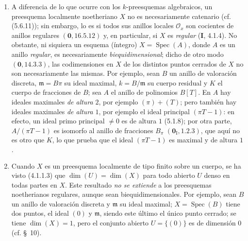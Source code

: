 \begin{remarks}[5.2.5]
\label{IV.2.5.2.5-fr}
\begin{enumerate}
\item[(i)] A diferencia de lo que ocurre con los $k$-preesquemas algebraicos,
un preesquema localmente noetheriano $X$ no es necesariamente catenario
(cf. (5.6.11)); sin embargo, lo es si todos sus anillos locales $\mathcal O_x$
son cocientes de anillos regulares $(\mathbf{0},16.5.12)$ y, en particular, si $X$ es
\emph{regular} (\textbf I, 4.1.4). No obstante, ni siquiera un esquema (íntegro)
$X=\operatorname{Spec}(A)$, donde $A$ es un anillo \emph{regular}, es
necesariamente \emph{biequidimensional}; dicho de otro modo $(\mathbf{0},14.3.3)$,
las codimensiones en $X$ de los distintos puntos cerrados de $X$ no son
necesariamente las mismas. Por ejemplo, sean $B$ un anillo de valoración
discreta, $\mathfrak m=B\pi$ su ideal maximal, $k=B/\mathfrak m$ su cuerpo
residual y $K$ el cuerpo de fracciones de $B$; sea $A$ el anillo de polinomios
$B[T]$. En $A$ hay ideales maximales \emph{de altura} $2$, por ejemplo
$(\pi)+(T)$; pero también hay ideales maximales \emph{de altura} $1$, por
ejemplo el ideal principal $(\pi T-1)$: en efecto, un ideal primo principal
$\ne0$ es de altura $1$ (5.1.8); por otra parte,
$A/(\pi T-1)$ es isomorfo al anillo de fracciones $B_\pi$
$(\mathbf{0}_{\mathrm I},1.2.3)$, que aquí no es otro que $K$, lo que prueba que el
ideal $(\pi T-1)$ es maximal y de altura $1$.

\item[(ii)] Cuando $X$ es un preesquema localmente de tipo finito sobre un
cuerpo, se ha visto (4.1.1.3) que $\dim(U)=\dim(X)$ para todo abierto $U$
denso en todas partes en $X$. Este resultado \emph{no se extiende} a los
preesquemas noetherianos regulares, aunque sean biequidimensionales. Por
ejemplo, sean $B$ un anillo de valoración discreta y $\mathfrak m$ su ideal
maximal; $X=\operatorname{Spec}(B)$ tiene dos puntos, el ideal $(0)$ y
$\mathfrak m$, siendo este último el único punto cerrado; se tiene
$\dim(X)=1$, pero el conjunto abierto $U=\{(0)\}$ es de dimensión $0$
(cf. \S~10).
\end{enumerate}
\end{remarks}

